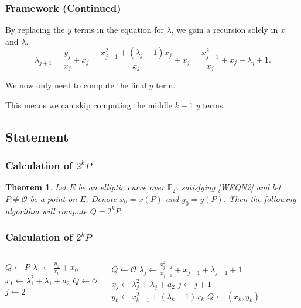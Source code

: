\documentclass[xcolor=pdftex,dvipsnames,table]{beamer}
\theoremstyle{plain}
\newtheorem{thm}{Theorem}[section]
\theoremstyle{definition}
\def\FF{\mathbb{F}}
\begin{document}
\begin{frame}
	\frametitle{Framework (Continued)}
	
	By replacing the $y$ terms in the equation for $\lambda$, we gain a recursion solely in $x$ and $\lambda$.
	\begin{equation}
	\lambda_{j+1}=\frac{y_j}{x_j}+x_j=\frac{x_{j-1}^2+(\lambda_j+1)x_j}{x_j}+x_j=\frac{x_{j-1}^2}{x_j}+x_j+\lambda_j+1\label{eqnlmb2}.
	\end{equation}
	
	We now only need to compute the final $y$ term.
	
	This means we can skip computing the middle $k-1$ $y$ terms.
\end{frame}

\subsection[Statement]{Statement}

\begin{frame}
	\frametitle{Calculation of $2^kP$}
	
	\begin{thm} \label{2kP}
		Let $E$ be an elliptic curve over $\FF_{2^n}$ satisfying \autoref{WEQN2} and let $P\neq\mathcal{O}$ be a point on $E$.
		Denote $x_0=x(P)$ and $y_0=y(P)$.
		Then the following algorithm will compute $Q=2^k P$.
	\end{thm}
\end{frame}

\begin{frame}
	\frametitle{Calculation of $2^kP$}
	\begin{columns}[T]
		\begin{algorithmic}
		\State $Q\gets P$
		\EndIf
		\State $\displaystyle \lambda_1\gets\frac{y_0}{x_0}+x_0$
		\State $\displaystyle x_1 \gets \lambda_1^2+\lambda_1+a_2$
		\State $Q\gets\mathcal{O}$
		\EndIf
		\State $j \gets 2$
		\end{algorithmic}
		\column{0.6\textwidth}
		\begin{algorithmic}
		\While{$j\leq k$}
		\If{$x_{j-1}=0$}
		\State  $Q\gets\mathcal{O}$
		\EndIf
		\State $\displaystyle \lambda_j\gets\frac{x_{j-2}^2}{x_{j-1}}+x_{j-1}+\lambda_{j-1}+1$
		\State $x_j\gets \lambda_j^2+\lambda_j+a_2$
		\State $j\gets j+1$
		\EndWhile
		\State $y_k\gets x_{k-1}^2+(\lambda_{k}+1)x_k$
		\State $Q\gets(x_k,y_k)$
		\end{algorithmic}
	\end{columns}
\end{frame}
\end{document}
